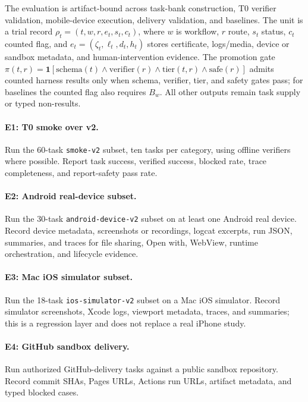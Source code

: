 \documentclass{article}
\begin{document}
The evaluation is artifact-bound across task-bank construction, T0 verifier validation, mobile-device execution, delivery validation, and baselines.
The unit is a trial record \(\rho_t=(t,w,r,e_t,s_t,c_t)\), where \(w\) is workflow, \(r\) route, \(s_t\) status, \(c_t\) counted flag, and \(e_t=(\zeta_t,\ell_t,d_t,h_t)\) stores certificate, logs/media, device or sandbox metadata, and human-intervention evidence.
The promotion gate \(\pi(t,r)=\mathbf{1}[\mathrm{schema}(t)\land\mathrm{verifier}(r)\land\mathrm{tier}(t,r)\land\mathrm{safe}(r)]\) admits counted harness results only when schema, verifier, tier, and safety gates pass; for baselines the counted flag also requires \(B_w\).
All other outputs remain task supply or typed non-results.

\paragraph{E1: T0 smoke over v2.}
Run the 60-task \texttt{smoke-v2} subset, ten tasks per category, using offline verifiers where possible.
Report task success, verified success, blocked rate, trace completeness, and report-safety pass rate.

\paragraph{E2: Android real-device subset.}
Run the 30-task \texttt{android-device-v2} subset on at least one Android real device.
Record device metadata, screenshots or recordings, logcat excerpts, run JSON, summaries, and traces for file sharing, Open with, WebView, runtime orchestration, and lifecycle evidence.

\paragraph{E3: Mac iOS simulator subset.}
Run the 18-task \texttt{ios-simulator-v2} subset on a Mac iOS simulator.
Record simulator screenshots, Xcode logs, viewport metadata, traces, and summaries; this is a regression layer and does not replace a real iPhone study.

\paragraph{E4: GitHub sandbox delivery.}
Run authorized GitHub-delivery tasks against a public sandbox repository.
Record commit SHAs, Pages URLs, Actions run URLs, artifact metadata, and typed blocked cases.
\end{document}
